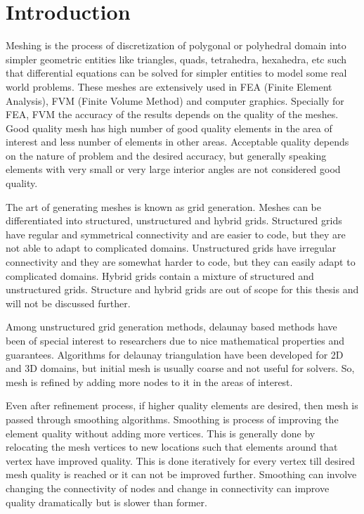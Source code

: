 \chapter{Introduction}
Meshing is the process of discretization of polygonal or polyhedral domain into simpler geometric entities like triangles, quads, tetrahedra, hexahedra, etc such that differential equations can be solved for simpler entities to model some real world problems. These meshes are extensively used in FEA (Finite Element Analysis), FVM (Finite Volume Method) and computer graphics. Specially for FEA, FVM the accuracy of the results depends on the quality of the meshes. Good quality mesh has high number of good quality elements in the area of interest and less number of elements in other areas. Acceptable quality depends on the nature of problem and the desired accuracy, but generally speaking elements with very small or very large interior angles are not considered good quality.

The art of generating meshes is known as grid generation. Meshes can be differentiated into structured, unstructured and hybrid grids. Structured grids have regular and symmetrical connectivity and are easier to code, but they are not able to adapt to complicated domains. Unstructured grids have irregular connectivity and they are somewhat harder to code, but they can easily adapt to complicated domains. Hybrid grids contain a mixture of structured and unstructured grids. Structure and hybrid grids are out of scope for this thesis and will not be discussed further.

Among unstructured grid generation methods, delaunay based methods have been of special interest to researchers due to nice mathematical properties and guarantees. Algorithms for delaunay triangulation have been developed for 2D and 3D domains, but initial mesh is usually coarse and not useful for solvers. So, mesh is refined by adding more nodes to it in the areas of interest. 

Even after refinement process, if higher quality elements are desired, then mesh is passed through smoothing algorithms. Smoothing is process of improving the element quality without adding more vertices. This is generally done by relocating the mesh vertices to new locations such that elements around that vertex have improved quality. This is done iteratively for every vertex till desired mesh quality is reached or it can not be improved further. Smoothing can involve changing the connectivity of nodes and change in connectivity can improve quality dramatically but is slower than former.

